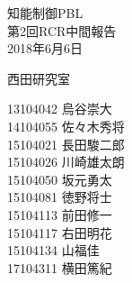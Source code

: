 \begin{titlepage}

  \vspace*{25mm}

  \begin{center}
    {\huge 知能制御PBL\\}
    \vspace{10mm}
    {\Huge 第2回RCR中間報告\\}
    \vspace{20mm}
    {\Large 2018年6月6日}

    \vspace{15mm}

    {\LARGE 西田研究室\\}

    \vspace{15mm}

    {\Large
   13104042 烏谷崇大　\\
   14104055 佐々木秀将\\
   15104021 長田駿二郎\\
   15104026 川崎雄太朗\\
   15104050 坂元勇太　\\
   15104081 徳野将士　\\
   15104113 前田修一　\\
   15104117 右田明花　\\
   15104134 山福佳　　\\
   17104311 横田篤紀　\\
}

  \end{center}

\end{titlepage}
